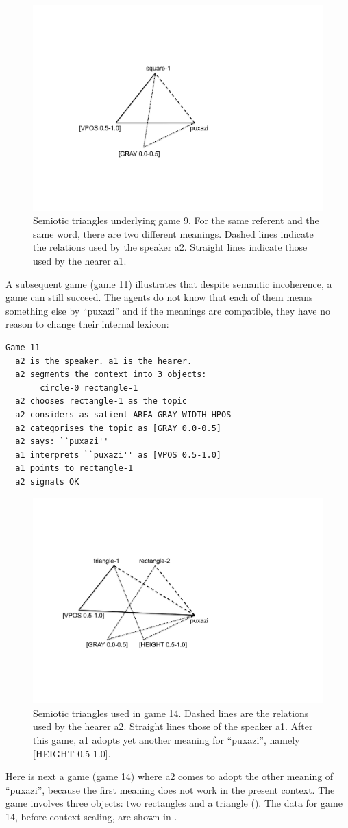 \begin{figure}[htbp]
  \centerline{\includegraphics[width=.45\textwidth]{chap6/figs/triangle4}}
\caption{\label{triangle4} Semiotic triangles
underlying game 9. For the same referent and the same word, 
there are two different meanings. Dashed lines indicate
the relations used by the speaker {\bfshape  a2}. Straight lines
indicate those used by the hearer {\bfshape  a1}.}
\end{figure}

A subsequent game (game 11) illustrates that despite 
semantic incoherence, a game can still succeed. The agents 
do not know that each of them means something else by 
``puxazi'' and if the meanings are compatible, they 
have no reason to change their internal lexicon:
\begin{verbatim}
Game 11
  a2 is the speaker. a1 is the hearer. 
  a2 segments the context into 3 objects: 
       circle-0 rectangle-1
  a2 chooses rectangle-1 as the topic 
  a2 considers as salient AREA GRAY WIDTH HPOS 
  a2 categorises the topic as [GRAY 0.0-0.5]
  a2 says: ``puxazi''
  a1 interprets ``puxazi'' as [VPOS 0.5-1.0]
  a1 points to rectangle-1
  a2 signals OK 
\end{verbatim}



\begin{figure}[htbp]
  \centerline{\includegraphics[width=.60\textwidth]{chap6/figs/triangle3}}
\caption{\label{triangle3} Semiotic triangles used in
game 14. Dashed lines are the relations used by 
the hearer {\bfshape  a2}. Straight lines those of the 
speaker {\bfshape  a1}. After this game, {\bfshape  a1}
adopts yet another meaning for ``puxazi'', namely 
{}[HEIGHT 0.5-1.0].}
\end{figure}
Here is next a game (game 14) where {\bfshape  a2} comes to adopt 
the other meaning of ``puxazi'', because the first
meaning does not work in the present context. 
The game involves three objects: two rectangles and a 
triangle ().
The data for game 14, before context scaling, are
shown in . 


